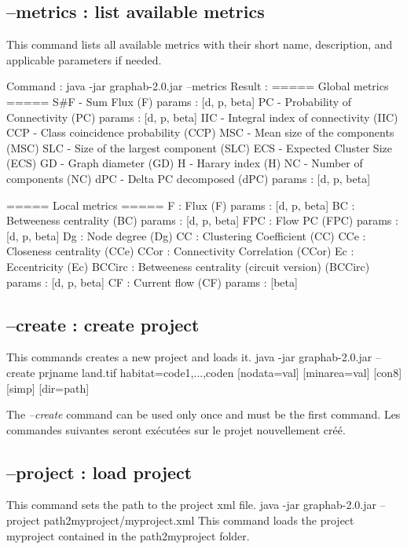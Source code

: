 \documentclass[a4paper,10pt]{report}
\newenvironment{cmd}
{\quote\Verbatim}
{\endVerbatim\endquote}
\begin{document}
\subsection{--metrics : list available metrics}
This command lists all available metrics with their short name, description, and applicable parameters if needed.

Command :
\begin{cmd}
java -jar graphab-2.0.jar --metrics
\end{cmd}
Result :
\begin{cmd}
===== Global metrics =====
S#F - Sum Flux (F)
	params : [d, p, beta]
PC - Probability of Connectivity (PC)
	params : [d, p, beta]
IIC - Integral index of connectivity (IIC)
CCP - Class coincidence probability (CCP)
MSC - Mean size of the components (MSC)
SLC - Size of the largest component (SLC)
ECS - Expected Cluster Size (ECS)
GD - Graph diameter (GD)
H - Harary index (H)
NC - Number of components (NC)
dPC - Delta PC decomposed (dPC)
	params : [d, p, beta]

===== Local metrics =====
F : Flux (F)
	params : [d, p, beta]
BC : Betweeness centrality (BC)
	params : [d, p, beta]
FPC : Flow PC (FPC)
	params : [d, p, beta]
Dg : Node degree (Dg)
CC : Clustering Coefficient (CC)
CCe : Closeness centrality (CCe)
CCor : Connectivity Correlation (CCor)
Ec : Eccentricity (Ec)
BCCirc : Betweeness centrality (circuit version) (BCCirc)
	params : [d, p, beta]
CF : Current flow (CF)
	params : [beta]
\end{cmd}

\subsection{--create : create project}
This commands creates a new project and loads it.
\begin{cmd}
java -jar graphab-2.0.jar --create prjname land.tif habitat=code1,...,coden [nodata=val]
[minarea=val] [con8] [simp] [dir=path]
\end{cmd}

The \textit{--create} command can be used only once and must be the first command.
Les commandes suivantes seront exécutées sur le projet nouvellement créé.

\subsection{--project : load project}
This command sets the path to the project xml file.
\begin{cmd}
java -jar graphab-2.0.jar --project path2myproject/myproject.xml
\end{cmd}
This command loads the project myproject contained in the path2myproject folder.
\end{document}
